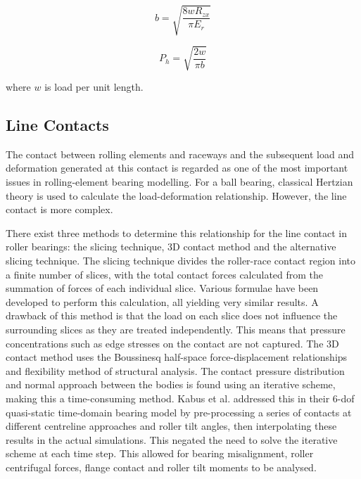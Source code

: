 \begin{equation}\label{eq2.3}
	b=\sqrt{\frac{8 w R_{z x}}{\pi E_r}}
\end{equation}

\begin{equation}\label{eq2.4}
	P_h=\sqrt{\frac{2 w}{\pi b}}
\end{equation}

where $w$ is load per unit length.

\subsection{Line Contacts}

The contact between rolling elements and raceways and the subsequent load and deformation generated at this contact is regarded as one of the most important issues in rolling-element bearing modelling. For a ball bearing, classical Hertzian theory is used to calculate the load-deformation relationship. However, the line contact is more complex.

There exist three methods to determine this relationship for the line contact in roller bearings: the slicing technique, 3D contact method and the alternative slicing technique. The slicing technique \cite{Andreason1973} divides the roller-race contact region into a finite number of slices, with the total contact forces calculated from the summation of forces of each individual slice. Various formulae have been developed to perform this calculation, all yielding very similar results. A drawback of this method is that the load on each slice does not influence the surrounding slices as they are treated independently. This means that pressure concentrations such as edge stresses on the contact are not captured. The 3D contact method uses the Boussinesq half-space force-displacement relationships and flexibility method of structural analysis. The contact pressure distribution and normal approach between the bodies is found using an iterative scheme, making this a time-consuming method. Kabus et al. \cite{Kabus2012} addressed this in their 6-dof quasi-static time-domain bearing model  by pre-processing a series of contacts at different centreline approaches  and roller tilt angles, then interpolating these results in the actual simulations. This negated the need to solve the iterative scheme at each time step. This allowed for bearing misalignment, roller centrifugal forces, flange contact and roller tilt moments to be analysed. 

